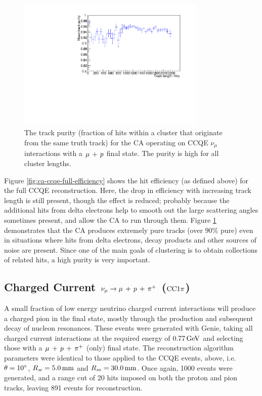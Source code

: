 \begin{figure}
    \centering
    \includegraphics[angle=-90,width=0.8\textwidth]{chapters/cellularautomaton_images/ccqe-purity}
    \caption[Track purity for CCQE events reconstructed with a CA]{\label{fig:ca-ccqe-full-purity}The track purity (fraction of hits within a cluster that originate from the same truth track) for the CA operating on CCQE $\nu_\mu$ interactions with a $\mu\,+\,p$ final state. The purity is high for all cluster lengths.}
\end{figure}

Figure \ref{fig:ca-ccqe-full-efficiency} shows the hit efficiency (as defined above) for the full CCQE reconstruction. Here, the drop in efficiency with increasing track length is still present, though the effect is reduced; probably because the additional hits from delta electrons help to smooth out the large scattering angles sometimes present, and allow the \ac{CA} to run through them. Figure \ref{fig:ca-ccqe-full-purity} demonstrates that the \ac{CA} produces extremely pure tracks (over $90\%$ pure) even in situations where hits from delta electrons, decay products and other sources of noise are present. Since one of the main goals of clustering is to obtain collections of related hits, a high purity is very important.

\subsection{Charged Current $\nu_\mu \rightarrow \mu\,+\,p\,+\,\pi^{+}$ ($\mathrm{CC}1\pi$)}
A small fraction of low energy neutrino charged current interactions will produce a charged pion in the final state, mostly through the production and subsequent decay of nucleon resonances. These events were generated with Genie, taking all charged current interactions at the required energy of $0.77\,\mathrm{GeV}$ and selecting those with a $\mu\,+\,p\,+\,\pi^{+}$ (only) final state. The reconstruction algorithm parameters were identical to those applied to the \ac{CCQE} events, above, i.e. $\theta=10^\circ$, $R_w=5.0\,\mathrm{mm}$ and $R_m=30.0\,\mathrm{mm}$. Once again, 1000 events were generated, and a range cut of 20 hits imposed on both the proton and pion tracks, leaving 891 events for reconstruction.

